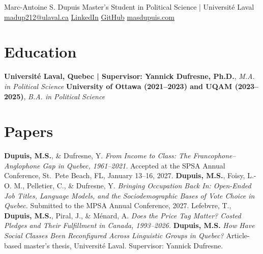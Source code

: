 \documentclass[10pt,letterpaper]{article}
\begin{document}
\cvheader
  {Marc-Antoine S. Dupuis}
  {Master's Student in Political Science | Université Laval}
  {\href{mailto:madup212@ulaval.ca}{madup212@ulaval.ca}\cvsep
   \href{https://www.linkedin.com/in/marc-antoine-dupuis-a6a069233/}{LinkedIn}\cvsep
   \href{https://github.com/MADUP212}{GitHub}\cvsep
   \href{https://www.masdupuis.com/}{masdupuis.com}}

\section*{Education}
  {\textbf{Université Laval, Quebec | Supervisor: Yannick Dufresne, Ph.D.}, \textit{M.A. in Political Science}}{}
  {\textbf{University of Ottawa (2021--2023) and UQAM (2023--2025)}, \textit{B.A. in Political Science}}{}

\section*{Papers}
  {\textbf{Dupuis, M.S.}, \& Dufresne, Y. \textit{From Income to Class: The Francophone--Anglophone Gap
   in Quebec, 1961--2021.}}
  {Accepted at the SPSA Annual Conference, St.\ Pete Beach, FL, January 13--16, 2027.}
  {\textbf{Dupuis, M.S.}, Foisy, L.-O. M., Pelletier, C., \& Dufresne, Y. \textit{Bringing Occupation
   Back In: Open-Ended Job Titles, Language Models, and the Sociodemographic Bases of Vote Choice in Quebec.}}
  {Submitted to the MPSA Annual Conference, 2027.}
  {Lefebvre, T., \textbf{Dupuis, M.S.}, Piral, J., \& Ménard, A. \textit{Does the Price Tag Matter?
   Costed Pledges and Their Fulfillment in Canada, 1993--2026.}}{}
  {\textbf{Dupuis, M.S.} \textit{How Have Social Classes Been Reconfigured Across Linguistic Groups
   in Quebec?}}
  {Article-based master's thesis, Université Laval. Supervisor: Yannick Dufresne.}
\end{document}
